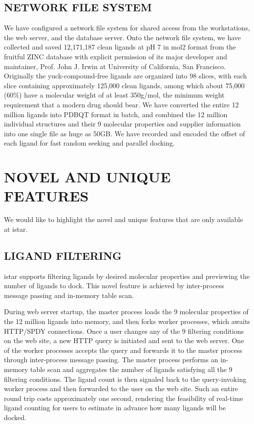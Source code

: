 \documentclass[12pt]{article}
\begin{document}
\subsection*{\sffamily \large NETWORK FILE SYSTEM}

We have configured a network file system for shared access from the workstations, the web server, and the database server. Onto the network file system, we have collected and saved 12,171,187 clean ligands at pH 7 in mol2 format from the fruitful ZINC database \citep{532,1178} with explicit permission of its major developer and maintainer, Prof. John J. Irwin at University of California, San Francisco. Originally the yuck-compound-free ligands are organized into 98 slices, with each slice containing approximately 125,000 clean ligands, among which about 75,000 (60\%) have a molecular weight of at least 350g/mol, the minimum weight requirement that a modern drug should bear. We have converted the entire 12 million ligands into PDBQT format in batch, and combined the 12 million individual structures and their 9 molecular properties and supplier information into one single file as huge as 50GB. We have recorded and encoded the offset of each ligand for fast random seeking and parallel docking.

\section*{\sffamily \Large NOVEL AND UNIQUE FEATURES}

We would like to highlight the novel and unique features that are only available at istar.

\subsection*{\sffamily \large LIGAND FILTERING}

istar supports filtering ligands by desired molecular properties and previewing the number of ligands to dock. This novel feature is achieved by inter-process message passing and in-memory table scan.

During web server startup, the master process loads the 9 molecular properties of the 12 million ligands into memory, and then forks worker processes, which awaits HTTP/SPDY connections. Once a user changes any of the 9 filtering conditions on the web site, a new HTTP query is initiated and sent to the web server. One of the worker processes accepts the query and forwards it to the master process through inter-process message passing. The master process performs an in-memory table scan and aggregates the number of ligands satisfying all the 9 filtering conditions. The ligand count is then signaled back to the query-invoking worker process and then forwarded to the user on the web site. Such an entire round trip costs approximately one second, rendering the feasibility of real-time ligand counting for users to estimate in advance how many ligands will be docked.
\end{document}
